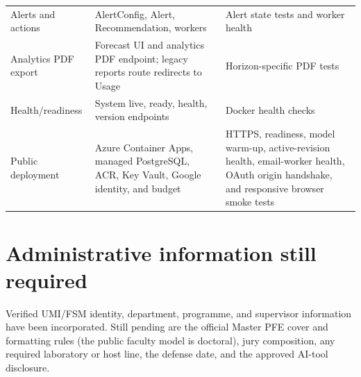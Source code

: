 \begin{longtable}{p{}p{}p{}}
Alerts and actions & AlertConfig, Alert, Recommendation, workers & Alert state tests and worker health \\
Analytics PDF export & Forecast UI and analytics PDF endpoint; legacy reports route redirects to Usage & Horizon-specific PDF tests \\
Health/readiness & System live, ready, health, version endpoints & Docker health checks \\
Public deployment & Azure Container Apps, managed PostgreSQL, ACR, Key Vault, Google identity, and budget & HTTPS, readiness, model warm-up, active-revision health, email-worker health, OAuth origin handshake, and responsive browser smoke tests \\
\bottomrule
\end{longtable}

\section{Administrative information still required}

Verified UMI/FSM identity, department, programme, and supervisor information have been incorporated. Still pending are the official Master PFE cover and formatting rules (the public faculty model is doctoral), jury composition, any required laboratory or host line, the defense date, and the approved AI-tool disclosure.
